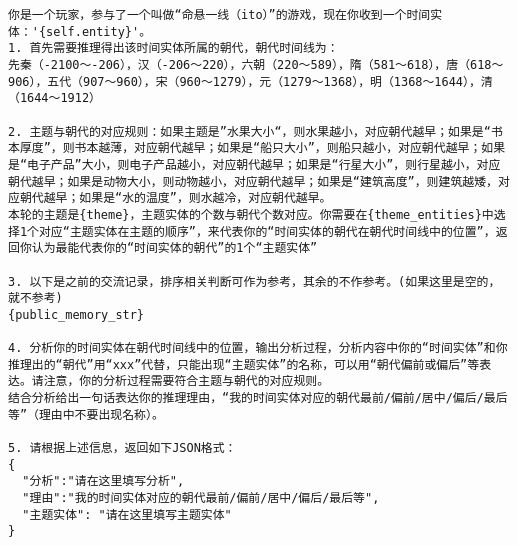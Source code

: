 \begin{figure*}[t]
\begin{tcolorbox}[title={\textbf{\small Prompt For Step1 of Timeline Ito Game}}, colback=whitesmoke, colframe=lightred, boxrule=2pt, arc=0mm]
{\small
\begin{verbatim}
你是一个玩家，参与了一个叫做“命悬一线（ito）”的游戏，现在你收到一个时间实体：'{self.entity}'。
1. 首先需要推理得出该时间实体所属的朝代，朝代时间线为：
先秦（-2100～-206），汉（-206～220），六朝（220～589），隋（581～618），唐（618～906），五代（907～960），宋（960～1279），元（1279～1368），明（1368～1644），清（1644～1912）

2. 主题与朝代的对应规则：如果主题是”水果大小“，则水果越小，对应朝代越早；如果是“书本厚度”，则书本越薄，对应朝代越早；如果是“船只大小”，则船只越小，对应朝代越早；如果是“电子产品”大小，则电子产品越小，对应朝代越早；如果是“行星大小”，则行星越小，对应朝代越早；如果是动物大小，则动物越小，对应朝代越早；如果是“建筑高度”，则建筑越矮，对应朝代越早；如果是“水的温度”，则水越冷，对应朝代越早。
本轮的主题是{theme}，主题实体的个数与朝代个数对应。你需要在{theme_entities}中选择1个对应“主题实体在主题的顺序”，来代表你的“时间实体的朝代在朝代时间线中的位置”，返回你认为最能代表你的“时间实体的朝代”的1个“主题实体”

3. 以下是之前的交流记录，排序相关判断可作为参考，其余的不作参考。(如果这里是空的，就不参考)
{public_memory_str}

4. 分析你的时间实体在朝代时间线中的位置，输出分析过程，分析内容中你的“时间实体”和你推理出的“朝代”用“xxx”代替，只能出现“主题实体”的名称，可以用“朝代偏前或偏后”等表达。请注意，你的分析过程需要符合主题与朝代的对应规则。
结合分析给出一句话表达你的推理理由，“我的时间实体对应的朝代最前/偏前/居中/偏后/最后等”（理由中不要出现名称）。

5. 请根据上述信息，返回如下JSON格式：
{
  "分析":"请在这里填写分析", 
  "理由":"我的时间实体对应的朝代最前/偏前/居中/偏后/最后等", 
  "主题实体": "请在这里填写主题实体"
}
\end{verbatim}
}
\end{tcolorbox}
\label{fig:game_step1}
\end{figure*}


